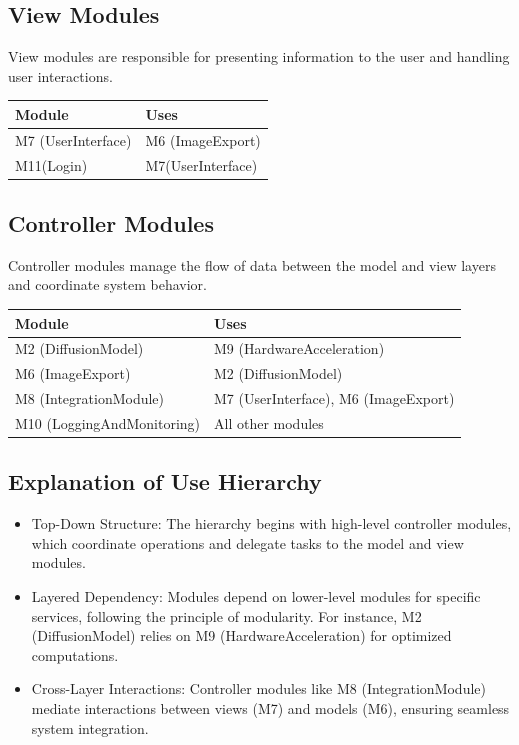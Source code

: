 \documentclass[12pt, titlepage]{article}
\begin{document}
\subsection{View Modules}
View modules are responsible for presenting information to the user and handling user interactions.

\begin{table}[H]
  \begin{tabular}{l|l}
  \textbf{Module} & \textbf{Uses} \\
  \hline
  M7 (UserInterface) & M6 (ImageExport) \\
  M11(Login) & M7(UserInterface)
  \end{tabular}
\end{table}

\subsection{Controller Modules}
Controller modules manage the flow of data between the model and view layers and coordinate system behavior.

\begin{table}[H]
  \begin{tabular}{l|l}
  \textbf{Module} & \textbf{Uses} \\
  \hline
  M2 (DiffusionModel) & M9 (HardwareAcceleration) \\
  M6 (ImageExport) & M2 (DiffusionModel) \\
  M8 (IntegrationModule) & M7 (UserInterface), M6 (ImageExport) \\
  M10 (LoggingAndMonitoring) & All other modules
  \end{tabular}
\end{table}

\subsection{Explanation of Use Hierarchy}

\begin{itemize}
  \item Top-Down Structure: The hierarchy begins with high-level controller modules, which coordinate operations and delegate tasks to the model and view modules.
  \item Layered Dependency: Modules depend on lower-level modules for specific services, following the principle of modularity. For instance, M2 (DiffusionModel) relies on M9 (HardwareAcceleration) for optimized computations.
  \item Cross-Layer Interactions: Controller modules like M8 (IntegrationModule) mediate interactions between views (M7) and models (M6), ensuring seamless system integration.
\end{itemize}
\end{document}

